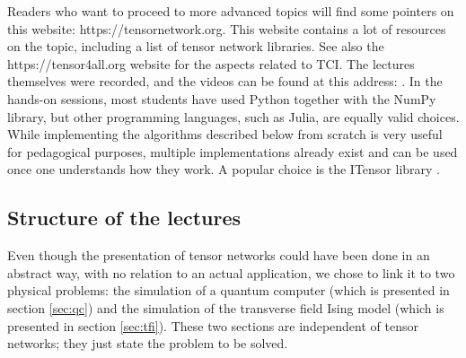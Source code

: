 \documentclass{SciPost}
\begin{document}
Readers who want to proceed to more advanced topics will find some pointers on this website:
https://tensornetwork.org. This website contains a lot of resources on the topic, including a list of tensor network libraries. See also the https://tensor4all.org website for the aspects related to TCI. The lectures themselves were recorded, and the videos can be found at this address: {\color{blue}{ https://www.youtube.com/@Quantuminspiredalgorithms}}. In the hands-on sessions, most students have used Python together with the NumPy library, but other programming languages, such as Julia, are equally valid choices. While implementing the algorithms described below from scratch is very useful for pedagogical purposes, multiple implementations already exist and can be used once one understands how they work. A popular choice is the ITensor library \cite{fishman2022}.

\subsection{Structure of the lectures}

Even though the presentation of tensor networks could have been done in an
abstract way, with no relation to an actual application, we chose to link it to
two physical problems: the simulation of a quantum computer (which is presented in
section \ref{sec:qc}) and the simulation of the transverse field Ising model
(which is presented in section \ref{sec:tfi}). These two sections are independent of
tensor networks; they just state the problem to be solved.
\end{document}
